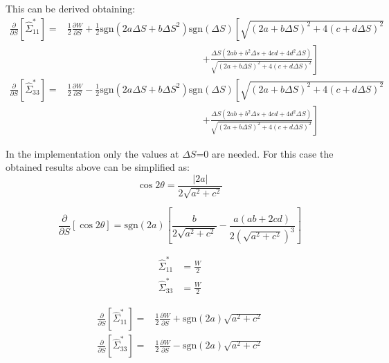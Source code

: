 This can be derived obtaining:
\begin{align}
\frac{\partial }{\partial S} \left[\hat{\Sigma}^*_{11} \right] =& \frac{1}{2}\frac{\partial W }{\partial S}
+\frac{1}{2}\mathrm{sgn}\left(2a\Delta S +b \Delta S^2 \right)\mathrm{sgn}(\Delta S)\left[
\sqrt{\left(2a +b \Delta S \right)^2 +4\left( c +d \Delta S\right)^2}
\right. \nonumber \\ & \qquad  \qquad \qquad \qquad \qquad  \qquad \qquad\left. 
+\frac{\Delta S \left(2ab+b^2 \Delta s +4 c d+ 4 d^2 \Delta S \right)}{\sqrt{\left(2a +b \Delta S \right)^2 +4\left( c +d \Delta S\right)^2}}
\right] \\
\frac{\partial }{\partial S} \left[\hat{\Sigma}^*_{33} \right] =& \frac{1}{2}\frac{\partial W }{\partial S}
-\frac{1}{2}\mathrm{sgn}\left(2a\Delta S +b \Delta S^2 \right)\mathrm{sgn}(\Delta S)\left[
\sqrt{\left(2a +b \Delta S \right)^2 +4\left( c +d \Delta S\right)^2}
\right. \nonumber \\ & \qquad  \qquad \qquad \qquad \qquad  \qquad \qquad\left. 
+\frac{\Delta S \left(2ab+b^2 \Delta s +4 c d+ 4 d^2 \Delta S \right)}{\sqrt{\left(2a +b \Delta S \right)^2 +4\left( c +d \Delta S\right)^2}}
\right] 
\end{align}

In the implementation only the values at $\Delta S$=0 are needed. For this case the obtained results above can be simplified as:
\begin{equation}
\cos 2 \theta = \frac{\left| 2a\right|}{2\sqrt{a^2 + c^2}}
\end{equation}

\begin{equation}
\frac{\partial }{\partial S} \left[ \cos 2\theta \right] = \mathrm{sgn}(2a)\left[
\frac{b}{2\sqrt{a^2 + c^2 }}-\frac{a(ab+2cd)}{2\left(\sqrt{a^2 + c^2}\right)^3}
\right]
\end{equation}

\begin{align}
\hat{\Sigma}^*_{11} &= \frac{W}{2}\\
\hat{\Sigma}^*_{33} &= \frac{W}{2}
\end{align}

\begin{align}
\frac{\partial }{\partial S} \left[\hat{\Sigma}^*_{11} \right] =& \frac{1}{2}\frac{\partial W }{\partial S}
+ \mathrm{sgn}(2a)\sqrt{a^2 + c^2 }
\\
\frac{\partial }{\partial S} \left[\hat{\Sigma}^*_{33} \right] =&\frac{1}{2}\frac{\partial W }{\partial S}
- \mathrm{sgn}(2a)\sqrt{a^2 + c^2 }
\end{align}

